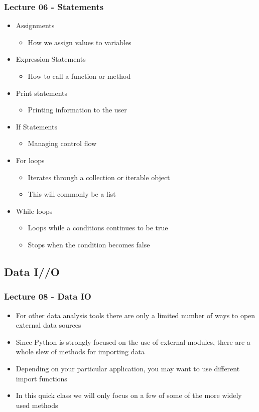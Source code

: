 \documentclass[mini frame in current subsection]{beamer}
\begin{document}
		\begin{frame}
			\frametitle{Lecture 06 - Statements}
			\begin{itemize}
				\vfill\item  Assignments
					\begin{itemize}
						\item  How we assign values to variables
					\end{itemize}
				\vfill\item  Expression Statements
					\begin{itemize}
						\item  How to call a function or method
					\end{itemize}
				\vfill\item  Print statements
					\begin{itemize}
						\item  Printing information to the user
					\end{itemize}
				\vfill\item  If Statements
					\begin{itemize}
						\item  Managing control flow
					\end{itemize}
				\vfill\item  For loops
					\begin{itemize}
						\item  Iterates through a collection or iterable object
						\item  This will commonly be a list
					\end{itemize}
				\vfill\item  While loops
					\begin{itemize}
						\item  Loops while a conditions continues to be true
						\item  Stops when the condition becomes false
					\end{itemize}
			\end{itemize}
		\end{frame}
		
	\subsection{Data I//O}
	
		\begin{frame}
			\frametitle{Lecture 08 - Data IO}
			\begin{itemize}
				\vfill\item  For other data analysis tools there are only a limited number of ways to open external data sources
				\vfill\item  Since Python is strongly focused on the use of external modules, there are a whole slew of methods for importing data
				\vfill\item  Depending on your particular application, you may want to use different import functions
				\vfill\item  In this quick class we will only focus on a few of some of the more widely used methods
			\end{itemize}
		\end{frame}
		
\end{document}
